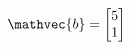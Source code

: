 \documentclass[preview]{standalone}
\begin{document}
\begin{align*}
\mathvec{b} = \begin{bmatrix} 5 \\ 1 \end{bmatrix}
\end{align*}
\end{document}

